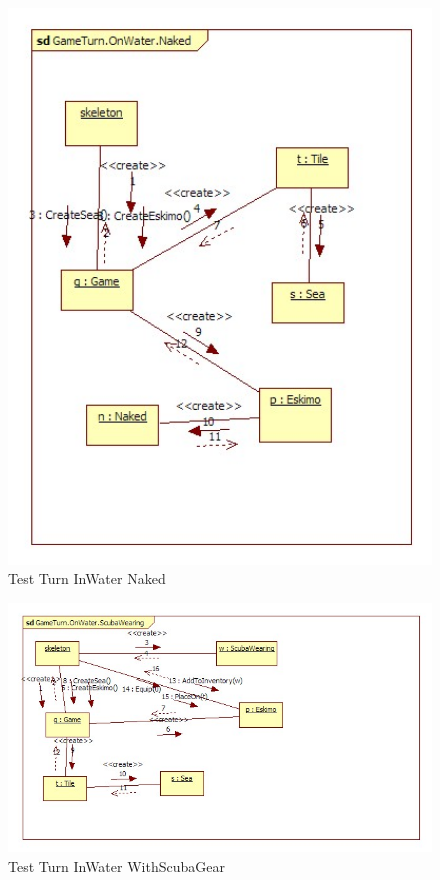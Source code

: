 \begin{figure}[h]
	\begin{center}
		\includegraphics[width=17cm]{chapters/chapter05/diagrams/Test_Turn_InWater_Naked_init.jpg}
		\caption{Test Turn InWater Naked}
		\label{fig:Test Turn InWater Naked}
	\end{center}
\end{figure}

\begin{figure}[h]
	\begin{center}
		\includegraphics[width=17cm]{chapters/chapter05/diagrams/Test_Turn_InWater_WithScubaGear_init.jpg}
		\caption{Test Turn InWater WithScubaGear}
		\label{fig:Test Turn InWater WithScubaGear}
	\end{center}
\end{figure}

